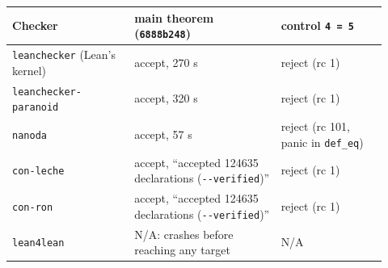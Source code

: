 \documentclass[11pt]{article}
\theoremstyle{definition}
\newcommand{\lean}[1]{\texttt{#1}}
\begin{document}
\begin{center}\small
\begin{tabular}{@{}P{0.3\linewidth}P{0.36\linewidth}P{0.26\linewidth}@{}}
\toprule
Checker & main theorem (\lean{6888b248}) & control \lean{4 = 5} \\
\midrule
\lean{leanchecker} (Lean's kernel) & accept, 270 s & reject (rc 1) \\
\lean{leanchecker-paranoid} & accept, 320 s & reject (rc 1) \\
\lean{nanoda} \cite{nanoda} & accept, 57 s & reject (rc 101, panic in \lean{def\_\allowbreak{}eq}) \\
\lean{con-leche} & accept, ``accepted 124635 declarations (\texttt{-{}-verified})'' & reject (rc 1) \\
\lean{con-ron} & accept, ``accepted 124635 declarations (\texttt{-{}-verified})'' & reject (rc 1) \\
\lean{lean4lean} \cite{lean4lean} & N/A: crashes before reaching any target & N/A \\
\bottomrule
\end{tabular}
\end{center}
\end{document}
